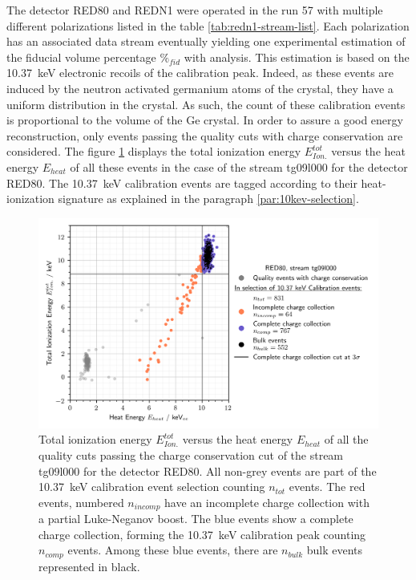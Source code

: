The detector RED80 and REDN1 were operated in the run 57 with multiple different polarizations listed in the table \ref{tab:redn1-stream-list}. Each polarization has an associated data stream eventually yielding one experimental estimation of the fiducial volume percentage $\%_{fid}$ with analysis. 
This estimation is based on the \SI{10.37}{\kilo\eV} electronic recoils of the calibration peak. Indeed, as these events are induced by the neutron activated germanium atoms of the crystal, they have a uniform distribution in the crystal. As such, the count of these calibration events is proportional to the volume of the Ge crystal. 
In order to assure a good energy reconstruction, only events passing the quality cuts with charge conservation are considered. The figure \ref{fig:fiducial-count} displays the total ionization energy $E_{Ion.}^{tot}$ versus the heat energy $E_{heat}$ of all these events in the case of the stream tg09l000 for the detector RED80. The \SI{10.37}{\kilo\eV} calibration events are tagged according to their heat-ionization signature as explained in the paragraph \ref{par:10kev-selection}.

\begin{figure}
\centering
\includegraphics[scale=1]{Figures/ElectrodesExperimental/fiducial_counts.png}
\caption{Total ionization energy $E_{Ion.}^{tot}$ versus the heat energy $E_{heat}$ of all the quality cuts passing the charge conservation cut of the stream tg09l000 for the detector RED80. All non-grey events are part of the \SI{10.37}{\kilo\eV} calibration event selection counting $n_{tot}$ events. The red events, numbered $n_{incomp}$ have an incomplete charge collection with a partial Luke-Neganov boost. The blue events show a complete charge collection, forming the \SI{10.37}{\kilo\eV} calibration peak counting $n_{comp}$ events. Among these blue events, there are $n_{bulk}$ bulk events represented in black.}
\label{fig:fiducial-count}
\end{figure}

